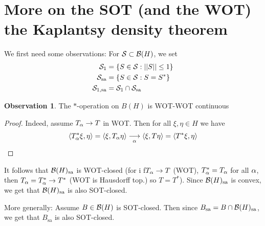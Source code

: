 \documentclass[10pt,english,a4paper]{article}
\theoremstyle{definition}
\newtheorem*{observation}{Observation}
\def\sa{\text{sa}}
\begin{document}
\section{More on the SOT (and the WOT) the Kaplantsy density theorem}
We first need some observations:
For $\mathcal{S} \subset \mathcal{B}(H)$, we set 
\begin{align*}
    \Ss_1 &= \{S \in \Ss: ||S|| \leq 1\} \\
    \Ss_{\sa} &= \{S \in \Ss: S = S^*\} \\
    \Ss_{1,\sa} &=\Ss_1 \cap \Ss_{\sa}
\end{align*}
\begin{observation}
    The $*$-operation on $B(H)$ is WOT-WOT continuous
\end{observation}
\begin{proof}
    Indeed, assume $T_{\alpha} \to T$ in WOT. Then for all 
$\xi,\eta \in H$ we have 
\begin{align*}
    \left\langle T_{\alpha}^{*}\xi,\eta \right\rangle = \left\langle \xi,T_{\alpha}\eta \right\rangle \underset{\alpha}{\longrightarrow}
\left\langle \xi, T\eta \right\rangle = \left\langle T^*\xi,\eta \right\rangle 
\end{align*}
\end{proof}
It follows that $\Bs(H)_{\sa}$ is WOT-closed
(for i f$T_{\alpha}\to T$ (WOT), $T_{\alpha}^* = T_{\alpha}$ for all $\alpha$,
then $T_{\alpha}= T^{*}_{\alpha}\to T^*$ (WOT is Hausdorff top.) so $T=T^*$).
Since $\Bs(H)_{\sa}$ is convex, we get that 
$\Bs(H)_{\sa}$ is also SOT-closed.

More generally: Assume $B \in \mathcal{B}(H)$ is SOT-closed. Then since 
$B_{\sa} = B\cap \Bs(H)_{\sa}$, we get that $B_{\sa}$ is also SOT-closed.
\end{document}
